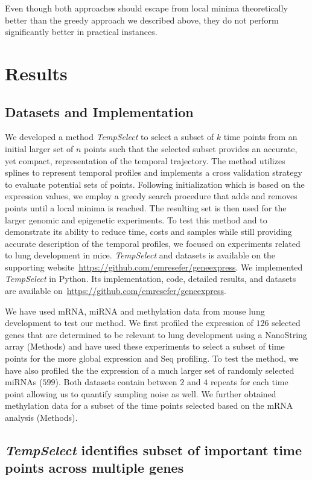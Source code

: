 \documentclass[10pt]{article}
\newcommand{\Tempselect}{\textit{TempSelect}\xspace}
\begin{document}
Even though both approaches should escape from local minima theoretically better than
the greedy approach we described above, they do not perform significantly
better in practical instances.


\section{Results}

\subsection{Datasets and Implementation}

We developed a method \Tempselect to select a subset of $k$ time points from an
initial larger set of $n$ points such that the selected subset provides an accurate, yet compact, representation of the temporal
trajectory. The method utilizes splines to represent temporal profiles and implements a cross
validation strategy to evaluate potential sets of points. Following
initialization which is based on the expression values, we employ a
greedy search procedure that adds and removes points until a local minima is reached. The resulting
set is then used for the larger genomic and epigenetic experiments. To test this method and to demonstrate its ability to reduce time,
costs and samples while still providing accurate description of the
temporal profiles, we focused on experiments related to lung
development in mice. \Tempselect and datasets is available on the supporting website~\url{https://github.com/emresefer/geneexpress}.
We implemented \Tempselect in Python. Its implementation, code, detailed results, and datasets are available
on~\url{https://github.com/emresefer/geneexpress}.

We have used mRNA, miRNA and methylation data from mouse lung
development to test our method. We first profiled the expression of
$126$ selected genes that are determined to be relevant to lung
development using a NanoString array (Methods) and have used these
experiments to select a subset of time points for the more global
expression and Seq profiling. To test the method, we have also
profiled the the expression of a much larger set of randomly
selected miRNAs ($599$). Both datasets contain between $2$ and $4$
repeats for each time point allowing us to quantify sampling noise
as well. We further obtained methylation data for a subset of the time points
selected based on the mRNA analysis (Methods).

\subsection{\Tempselect identifies subset of important time points across multiple genes}\label{sec:findsubset}
\end{document}
